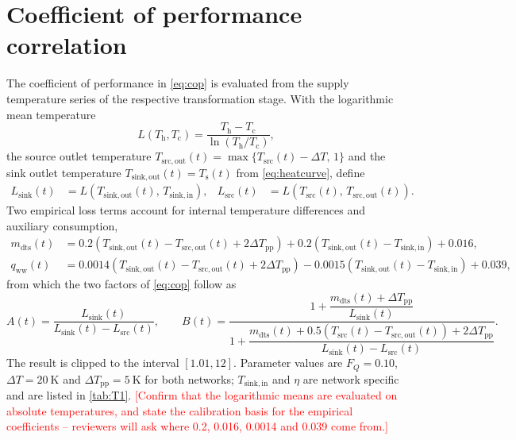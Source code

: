 \documentclass[review,3p]{elsarticle}
\newcommand{\placeholder}[1]{\textcolor{red}{[#1]}}
\begin{document}
\appendix

\section{Coefficient of performance correlation}
\label{app:cop}

The coefficient of performance in \cref{eq:cop} is evaluated from the
supply temperature series of the respective transformation stage. With
the logarithmic mean temperature
\begin{equation}
L(T_{\mathrm{h}}, T_{\mathrm{c}})
= \frac{T_{\mathrm{h}} - T_{\mathrm{c}}}{\ln (T_{\mathrm{h}}/T_{\mathrm{c}})},
\end{equation}
the source outlet temperature
$T_{\mathrm{src,out}}(t) = \max\{T_{\mathrm{src}}(t) - \Delta T,\, 1\}$
and the sink outlet temperature
$T_{\mathrm{sink,out}}(t) = T_{\mathrm{s}}(t)$ from
\cref{eq:heatcurve}, define
\begin{align}
L_{\mathrm{sink}}(t) &= L\!\left(T_{\mathrm{sink,out}}(t),\, T_{\mathrm{sink,in}}\right), &
L_{\mathrm{src}}(t) &= L\!\left(T_{\mathrm{src}}(t),\, T_{\mathrm{src,out}}(t)\right).
\end{align}
Two empirical loss terms account for internal temperature differences and
auxiliary consumption,
\begin{align}
m_{\mathrm{dts}}(t) &= 0.2\left(T_{\mathrm{sink,out}}(t) - T_{\mathrm{src,out}}(t) + 2\Delta T_{\mathrm{pp}}\right)
 + 0.2\left(T_{\mathrm{sink,out}}(t) - T_{\mathrm{sink,in}}\right) + 0.016, \\
q_{\mathrm{ww}}(t) &= 0.0014\left(T_{\mathrm{sink,out}}(t) - T_{\mathrm{src,out}}(t) + 2\Delta T_{\mathrm{pp}}\right)
 - 0.0015\left(T_{\mathrm{sink,out}}(t) - T_{\mathrm{sink,in}}\right) + 0.039,
\end{align}
from which the two factors of \cref{eq:cop} follow as
\begin{equation}
A(t) = \frac{L_{\mathrm{sink}}(t)}{L_{\mathrm{sink}}(t) - L_{\mathrm{src}}(t)},
\qquad
B(t) = \frac{1 + \dfrac{m_{\mathrm{dts}}(t) + \Delta T_{\mathrm{pp}}}{L_{\mathrm{sink}}(t)}}
{1 + \dfrac{m_{\mathrm{dts}}(t) + 0.5\left(T_{\mathrm{src}}(t) - T_{\mathrm{src,out}}(t)\right) + 2\Delta T_{\mathrm{pp}}}
{L_{\mathrm{sink}}(t) - L_{\mathrm{src}}(t)}} .
\end{equation}
The result is clipped to the interval $[1.01, 12]$. Parameter values are
$F_Q = \num{0.10}$, $\Delta T = \SI{20}{\kelvin}$ and
$\Delta T_{\mathrm{pp}} = \SI{5}{\kelvin}$ for both networks;
$T_{\mathrm{sink,in}}$ and $\eta$ are network specific and are listed in
\cref{tab:T1}.
\placeholder{Confirm that the logarithmic means are evaluated on absolute
temperatures, and state the calibration basis for the empirical
coefficients -- reviewers will ask where 0.2, 0.016, 0.0014 and 0.039
come from.}



\end{document}
